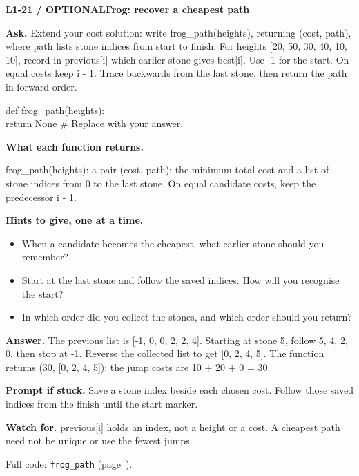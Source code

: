 \documentclass[11pt,a4paper]{article}
\begin{document}
\par\medskip
\noindent\begin{minipage}{\textwidth}
{\color{teal}\textbf{L1-21 / OPTIONAL}}\quad \textbf{Frog: recover a cheapest path}\par\smallskip
\textbf{Ask.} Extend your cost solution: write frog\_path(heights), returning (cost, path), where path lists stone indices from start to finish. For heights [20, 50, 30, 40, 10, 10], record in previous[i] which earlier stone gives best[i]. Use -1 for the start. On equal costs keep i - 1. Trace backwards from the last stone, then return the path in forward order.\par\smallskip
\par{}\par\smallskip\noindent\colorbox{codepaper}{\parbox{\dimexpr\linewidth-2\fboxsep\relax}{\small\ttfamily\raggedright def frog\_path(heights):\\\hspace*{2.4em}return None  \# Replace with your answer.}}\par
{\small\textbf{What each function returns.}\par frog\_path(heights): a pair (cost, path): the minimum total cost and a list of stone indices from 0 to the last stone. On equal candidate costs, keep the predecessor i - 1.\par }
{\small\textbf{Hints to give, one at a time.}}\begin{itemize}\item When a candidate becomes the cheapest, what earlier stone should you remember?\item Start at the last stone and follow the saved indices. How will you recognise the start?\item In which order did you collect the stones, and which order should you return?\end{itemize}
\textbf{Answer.} The previous list is [-1, 0, 0, 2, 2, 4]. Starting at stone 5, follow 5, 4, 2, 0, then stop at -1. Reverse the collected list to get [0, 2, 4, 5]. The function returns (30, [0, 2, 4, 5]): the jump costs are 10 + 20 + 0 = 30.\par\smallskip
\textbf{Prompt if stuck.} Save a stone index beside each chosen cost. Follow those saved indices from the finish until the start marker.\par\smallskip
\textbf{Watch for.} previous[i] holds an index, not a height or a cost. A cheapest path need not be unique or use the fewest jumps.\par\smallskip Full code: \texttt{frog\_path} (page~\pageref{L1-code-frog_path}).
\end{minipage}\par{}\medskip
\end{document}
